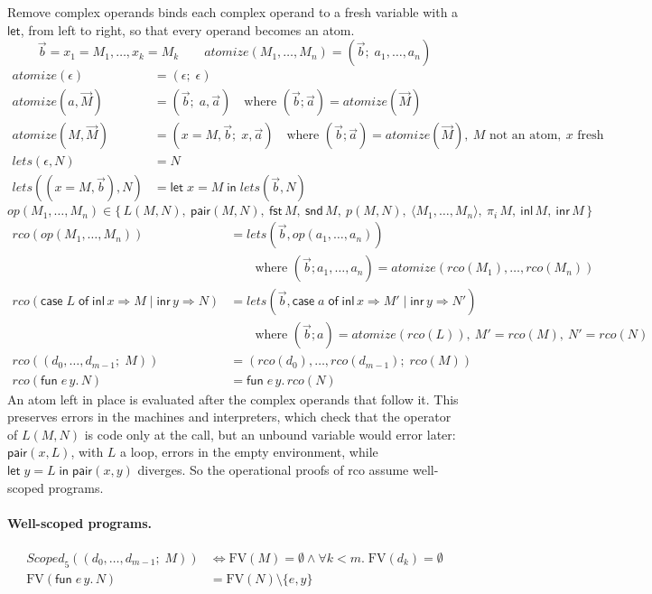 \documentclass[10pt]{article}
\theoremstyle{acmplain}
\newcommand{\key}[1]{\mathsf{#1}}
\newcommand{\pass}[1]{\mathit{#1}}
\newcommand{\Let}{\key{let}\;}
\newcommand{\In}{\;\key{in}\;}
\newcommand{\inl}{\key{inl}\,}
\newcommand{\inr}{\key{inr}\,}
\newcommand{\Case}[5]{\key{case}\;#1\;\key{of}\;\key{inl}\,#2 \Rightarrow #3 \mid \key{inr}\,#4 \Rightarrow #5}
\newcommand{\tuple}[1]{\langle #1 \rangle}
\newcommand{\prj}[1]{\pi_{#1}\,}
\newcommand{\pair}[2]{\key{pair}(#1, #2)}
\newcommand{\FST}{\key{fst}\,}
\newcommand{\SND}{\key{snd}\,}
\newcommand{\prim}[3]{#1(#2, #3)}
\newcommand{\FV}{\mathrm{FV}}
\begin{document}
Remove complex operands binds each complex operand to a fresh variable with a $\key{let}$, from left to right, so that every operand becomes an atom.
\[
  \vec{b} = x_1{=}M_1, \ldots, x_k{=}M_k
  \qquad
  \pass{atomize}(M_1, \ldots, M_n) = (\vec{b};\; a_1, \ldots, a_n)
\]
\begin{align*}
  \pass{atomize}(\epsilon) &= (\epsilon;\; \epsilon) \\
  \pass{atomize}(a, \vec{M}) &= (\vec{b};\; a, \vec{a})
     \quad\text{where } (\vec{b}; \vec{a}) = \pass{atomize}(\vec{M}) \\
  \pass{atomize}(M, \vec{M}) &= (x{=}M, \vec{b};\; x, \vec{a})
     \quad\text{where } (\vec{b}; \vec{a}) = \pass{atomize}(\vec{M}),\
     M \text{ not an atom},\ x \text{ fresh} \\[1ex]
  \pass{lets}(\epsilon, N) &= N \\
  \pass{lets}((x{=}M, \vec{b}), N) &= \Let x = M \In \pass{lets}(\vec{b}, N)
\end{align*}
\[
  \mathit{op}(M_1, \ldots, M_n) \in \{\, L(M, N),\ \pair{M}{N},\ \FST M,\ \SND M,\ \prim{p}{M}{N},\
     \tuple{M_1, \ldots, M_n},\ \prj{i} M,\ \inl M,\ \inr M \,\}
\]
\begin{align*}
  \pass{rco}(\mathit{op}(M_1, \ldots, M_n)) &= \pass{lets}(\vec{b}, \mathit{op}(a_1, \ldots, a_n)) \\
  &\qquad \text{where } (\vec{b}; a_1, \ldots, a_n) = \pass{atomize}(\pass{rco}(M_1), \ldots, \pass{rco}(M_n)) \\
  \pass{rco}(\Case{L}{x}{M}{y}{N}) &= \pass{lets}(\vec{b}, \Case{a}{x}{M'}{y}{N'}) \\
  &\qquad \text{where } (\vec{b}; a) = \pass{atomize}(\pass{rco}(L)),\ M' = \pass{rco}(M),\ N' = \pass{rco}(N) \\
  \pass{rco}((d_0, \ldots, d_{m-1};\; M)) &= (\pass{rco}(d_0), \ldots, \pass{rco}(d_{m-1});\; \pass{rco}(M)) \\
  \pass{rco}(\key{fun}\; e\,y.\,N) &= \key{fun}\; e\,y.\,\pass{rco}(N)
\end{align*}
An atom left in place is evaluated after the complex operands that follow
it. This preserves errors in the machines and interpreters, which
check that the operator of $L(M, N)$ is code only at the call, but an
unbound variable would error later: $\pair{x}{L}$, with $L$ a loop,
errors in the empty environment, while
$\Let y = L \In \pair{x}{y}$ diverges. So the operational proofs of rco
assume well-scoped programs.

\paragraph{Well-scoped programs.}
\begin{align*}
  \mathit{Scoped}_5((d_0, \ldots, d_{m-1};\; M)) &\iff \FV(M) = \emptyset \land
    \forall k < m.\; \FV(d_k) = \emptyset \\
  \FV(\key{fun}\; e\,y.\,N) &= \FV(N) \setminus \{e, y\}
\end{align*}
\end{document}
